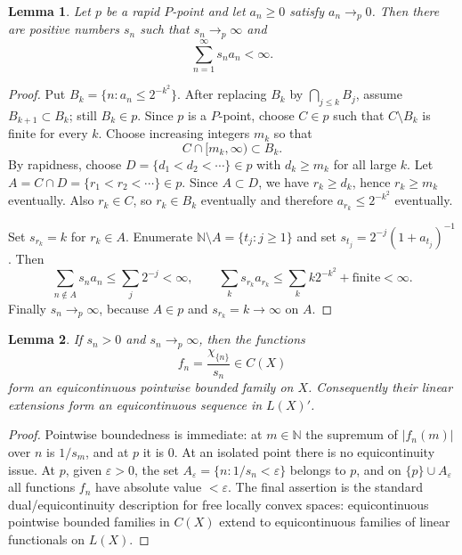 \documentclass[11pt]{article}
\newtheorem{lemma}{Lemma}
\newcommand{\N}{\mathbb N}
\begin{document}
\begin{lemma}\label{lem:diagonal}
Let \(p\) be a rapid \(P\)-point and let \(a_n\ge0\) satisfy \(a_n\to_p0\).
Then there are positive numbers \(s_n\) such that \(s_n\to_p\infty\) and
\[
   \sum_{n=1}^{\infty}s_n a_n<\infty .
\]
\end{lemma}

\begin{proof}
Put \(B_k=\{n:a_n\le 2^{-k^2}\}\). After replacing \(B_k\) by
\(\bigcap_{j\le k}B_j\), assume \(B_{k+1}\subset B_k\); still \(B_k\in p\).
Since \(p\) is a \(P\)-point, choose \(C\in p\) such that \(C\setminus B_k\) is
finite for every \(k\). Choose increasing integers \(m_k\) so that
\[
   C\cap [m_k,\infty)\subset B_k .
\]
By rapidness, choose \(D=\{d_1<d_2<\cdots\}\in p\) with \(d_k\ge m_k\) for all
large \(k\). Let \(A=C\cap D=\{r_1<r_2<\cdots\}\in p\). Since \(A\subset D\),
we have \(r_k\ge d_k\), hence \(r_k\ge m_k\) eventually. Also \(r_k\in C\), so
\(r_k\in B_k\) eventually and therefore \(a_{r_k}\le2^{-k^2}\) eventually.

Set \(s_{r_k}=k\) for \(r_k\in A\). Enumerate \(\N\setminus A=\{t_j:j\ge1\}\)
and set \(s_{t_j}=2^{-j}(1+a_{t_j})^{-1}\). Then
\[
  \sum_{n\notin A}s_n a_n\le \sum_j2^{-j}<\infty,
  \qquad
  \sum_{k} s_{r_k}a_{r_k}\le\sum_k k2^{-k^2}+\text{finite}<\infty.
\]
Finally \(s_n\to_p\infty\), because \(A\in p\) and \(s_{r_k}=k\to\infty\) on
\(A\).
\end{proof}

\begin{lemma}\label{lem:equicont}
If \(s_n>0\) and \(s_n\to_p\infty\), then the functions
\[
   f_n=\frac{\chi_{\{n\}}}{s_n}\in C(X)
\]
form an equicontinuous pointwise bounded family on \(X\). Consequently their
linear extensions form an equicontinuous sequence in \(L(X)'\).
\end{lemma}

\begin{proof}
Pointwise boundedness is immediate: at \(m\in\N\) the supremum of
\(|f_n(m)|\) over \(n\) is \(1/s_m\), and at \(p\) it is \(0\). At an isolated
point there is no equicontinuity issue. At \(p\), given \(\varepsilon>0\), the
set \(A_\varepsilon=\{n:1/s_n<\varepsilon\}\) belongs to \(p\), and on
\(\{p\}\cup A_\varepsilon\) all functions \(f_n\) have absolute value
\(<\varepsilon\). The final assertion is the standard dual/equicontinuity
description for free locally convex spaces: equicontinuous pointwise bounded
families in \(C(X)\) extend to equicontinuous families of linear functionals on
\(L(X)\).
\end{proof}
\end{document}
